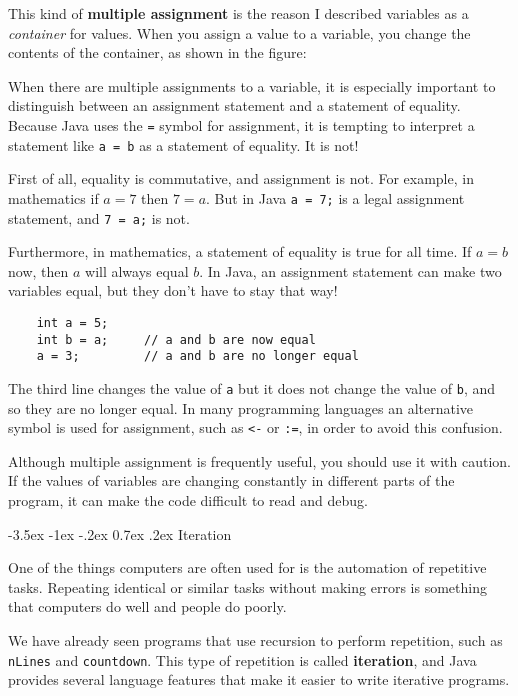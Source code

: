 \documentclass{book}
\makeatletter
\renewcommand{\section}{\@startsection 
    {section} {1} {0mm}%
    {-3.5ex \@plus -1ex \@minus -.2ex}%
    {0.7ex \@plus.2ex}%
    {\normalfont\Large\bfseries}}
\newcommand{\beforefig}{\vspace{1.3\parskip}}
\newcommand{\afterfig}{\vspace{-0.2\parskip}}
\newcommand{\myfig}[1]{
    \beforefig
    \centerline{\epsfig{#1,scale=0.8}}
    \afterfig
}
\makeatother
\begin{document}
This kind of {\bf multiple assignment} is the reason I
described variables as a {\em container} for values.  When
you assign a value to a variable, you change the contents of
the container, as shown in the figure:


\myfig{figure=figs/assign2.eps}


When there are multiple assignments to a variable, it is especially
important to distinguish between an assignment statement and a
statement of equality.  Because Java uses the {\tt =} symbol for
assignment, it is tempting to interpret a statement like {\tt a = b}
as a statement of equality.  It is not!

First of all, equality is commutative, and assignment is not.
For example, in mathematics if $a = 7$ then $7 = a$.  But in
Java {\tt a = 7;} is a legal assignment statement, and {\tt 7 = a;}
is not.

Furthermore, in mathematics, a statement of equality is true
for all time.  If $a = b$ now, then $a$ will always equal $b$.
In Java, an assignment statement can make two variables equal,
but they don't have to stay that way!

\begin{verbatim}
    int a = 5;
    int b = a;     // a and b are now equal
    a = 3;         // a and b are no longer equal
\end{verbatim}
%
The third line changes the value of {\tt a} but it does not
change the value of {\tt b}, and so they are no longer equal.
In many programming languages an alternative symbol is used
for assignment, such as {\tt <-} or {\tt :=}, in order to
avoid this confusion.

Although multiple assignment is frequently useful, you should
use it with caution.  If the values of variables are changing
constantly in different parts of the program, it can make
the code difficult to read and debug.

\section{Iteration}

One of the things computers are often used for is the automation
of repetitive tasks.  Repeating identical or similar tasks without
making errors is something that computers do well and people do
poorly.

We have already seen programs that use recursion to perform
repetition, such as {\tt nLines} and {\tt countdown}.  This
type of repetition is called {\bf iteration}, and Java provides
several language features that make it easier to write iterative
programs.
\end{document}
